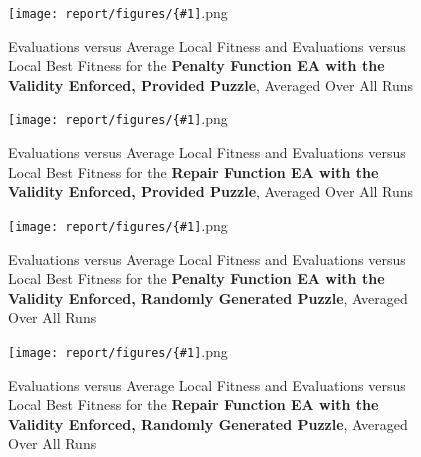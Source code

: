 \documentclass[11pt]{article}
\newcommand{\fitnessplotcaption}[1]{\caption{Evaluations versus Average Local Fitness and Evaluations versus 
    Local Best Fitness for the \textbf{{#1}}, Averaged Over All Runs}}
\newcommand{\addgraphic}[1]{\centerline{\texttt{[image: report/figures/\{\#1]}.png}}}
\begin{document}
\begin{figure}
    \addgraphic{website_puzzle_validity_enforced_graph}
    \fitnessplotcaption{Penalty Function EA with the Validity Enforced, Provided Puzzle}
    \label{fig:website_puzzle_validity_enforced_graph}
\end{figure}

\begin{figure}
    \addgraphic{website_puzzle_validity_enforced_bonus_graph}
    \fitnessplotcaption{Repair Function EA with the Validity Enforced, Provided Puzzle}
    \label{fig:website_puzzle_validity_enforced_bonus_graph}
\end{figure}

\begin{figure}
    \addgraphic{random_gen_validity_enforced_graph}
    \fitnessplotcaption{Penalty Function EA with the Validity Enforced, Randomly Generated Puzzle}
    \label{fig:random_gen_validity_enforced_graph}
\end{figure}

\begin{figure}
    \addgraphic{random_gen_validity_enforced_bonus_graph}
    \fitnessplotcaption{Repair Function EA with the Validity Enforced, Randomly Generated Puzzle}
    \label{fig:random_gen_validity_enforced_bonus_graph}
\end{figure}
\end{document}
